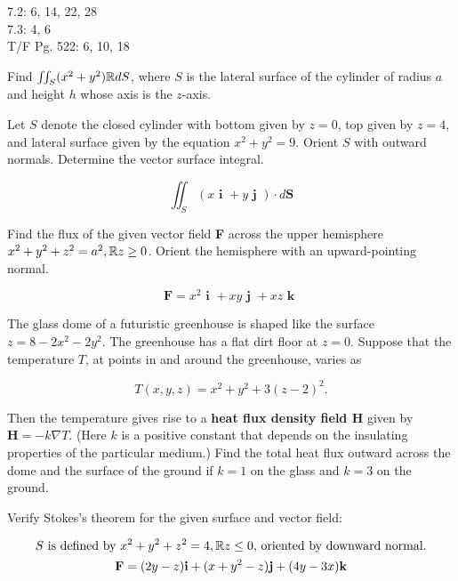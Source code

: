 \documentclass[11pt,letterpaper,boxed]{pset}
\newcommand{\B}[1]{\textbf{#1}}
\def \S {\R{ }}
\begin{document}
\begin{center}
    7.2: 6, 14, 22, 28 \\
	7.3: 4, 6 \\
	T/F Pg. 522: 6, 10, 18
\end{center}

\begin{problem} [7.2.6]
	Find $\iint_S (x^2 + y^2) \S dS$, where $S$ is the lateral surface of the cylinder of radius $a$ and height $h$ whose axis is the $z$-axis. 
\end{problem}
\newpage


\begin{problem} [7.2.14]
	Let $S$ denote the closed cylinder with bottom given by $z = 0$, top given by $z = 4$, and lateral surface given by the equation $x^2 + y^2 = 9$. Orient $S$ with outward normals. Determine the vector surface integral.

	\[\iint_S (x\B{ i } + y \B{ j }) \cdot d\B{S}\]
\end{problem}
\newpage


\begin{problem} [7.2.22]
	Find the flux of the given vector field \B{F} across the upper hemisphere $x^2 + y^2 + z^2 = a^2,\S z \geq 0$. Orient the hemisphere with an upward-pointing normal.

    \[\B{F} = x^2\B{ i } + xy \B{ j } + xz \B{ k }\]
\end{problem}
\newpage


\begin{problem} [7.2.28]
	The glass dome of a futuristic greenhouse is shaped like the surface $z = 8 - 2x^2 - 2y^2$. The greenhouse has a flat dirt floor  at $z = 0$. Suppose that the temperature $T$, at points in and around the greenhouse,  varies as

	\[T(x,y,z) = x^2 + y^2 + 3(z-2)^2.\]

	Then the temperature gives rise to a \B{heat flux density field H} given by $\B{H} = -k\nabla T$. (Here $k$ is a positive constant that depends on the insulating properties of the particular medium.) Find the total heat flux outward across the dome and the surface of the ground if $k = 1$ on the glass and $k = 3$ on the ground.
\end{problem}
\newpage


\begin{problem} [7.3.4]
	Verify Stokes’s theorem for the given surface and vector field: 
	
	\begin{gather*}
	    S \textrm{ is defined by } x^2 + y^2 + z^2 = 4, \S z \leq 0 \textrm{, oriented by downward normal.} \\
	    \B{F} = (2y-z)\B{i} + (x + y^2 - z)\B{j} + (4y -3x)\B{k}
	\end{gather*}
\end{problem}
\newpage
\end{document}
